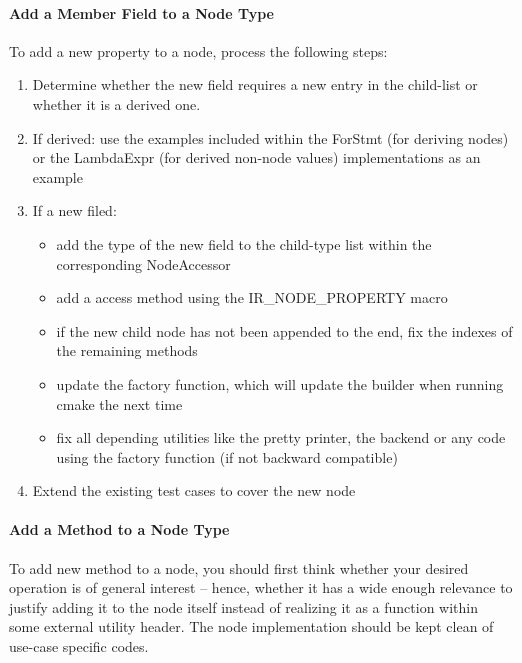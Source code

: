 \paragraph{Add a Member Field to a Node Type}
To add a new property to a node, process the following steps:
\begin{enumerate}
  \item Determine whether the new field requires a new entry in the child-list
  or whether it is a derived one.
  
  \item If derived: use the examples included within the ForStmt
  (for deriving nodes) or the LambdaExpr (for derived non-node
  values) implementations as an example
  
  \item If a new filed:
	\begin{itemize}
	  \item add the type of the new field to the child-type list
  	  within the corresponding NodeAccessor
  	  
  	  \item add a access method using the IR\_NODE\_PROPERTY macro

  	  \item if the new child node has not been appended to the end, fix the
  	  indexes of the remaining methods

  	  \item update the factory function, which will update the builder when
  	  running cmake the next time

  	  \item fix all depending utilities like the pretty printer, the backend or
  	  any code using the factory function (if not backward compatible)
	\end{itemize}
  
  \item Extend the existing test cases to cover the new node
\end{enumerate}

\paragraph{Add a Method to a Node Type} 
To add new method to a node, you should first think whether your desired
operation is of general interest -- hence, whether it has a wide enough
relevance to justify adding it to the node itself instead of realizing it
as a function within some external utility header. The node implementation
should be kept clean of use-case specific codes.

